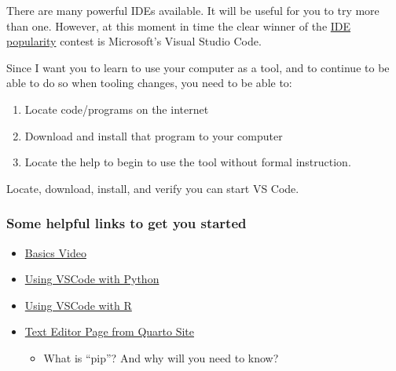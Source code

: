\documentclass[
  letterpaper,
  DIV=11,
  numbers=noendperiod]{scrreprt}
\providecommand{\tightlist}{%
  \setlength{\itemsep}{0pt}\setlength{\parskip}{0pt}}\usepackage{longtable,booktabs,array}
\begin{document}
There are many powerful IDEs available. It will be useful for you to try
more than one. However, at this moment in time the clear winner of the
\href{https://survey.stackoverflow.co/2023/\#most-popular-technologies-new-collab-tools}{IDE
popularity} contest is Microsoft's Visual Studio Code.

Since I want you to learn to use your computer as a tool, and to
continue to be able to do so when tooling changes, you need to be able
to:

\begin{enumerate}
\def\labelenumi{\arabic{enumi}.}
\item
  Locate code/programs on the internet
\item
  Download and install that program to your computer
\item
  Locate the help to begin to use the tool without formal instruction.
\end{enumerate}

\begin{tcolorbox}[enhanced jigsaw, opacityback=0, leftrule=.75mm, colback=white, left=2mm, titlerule=0mm, toprule=.15mm, toptitle=1mm, coltitle=black, title=\textcolor{quarto-callout-tip-color}{\faLightbulb}\hspace{0.5em}{In-class Exercise}, opacitybacktitle=0.6, colbacktitle=quarto-callout-tip-color!10!white, breakable, bottomrule=.15mm, bottomtitle=1mm, colframe=quarto-callout-tip-color-frame, arc=.35mm, rightrule=.15mm]

Locate, download, install, and verify you can start VS Code.

\end{tcolorbox}

\subsubsection{Some helpful links to get you
started}\label{some-helpful-links-to-get-you-started}

\begin{itemize}
\tightlist
\item
  \href{https://code.visualstudio.com/docs/introvideos/basics}{Basics
  Video}
\item
  \href{https://code.visualstudio.com/docs/languages/python}{Using
  VSCode with Python}
\item
  \href{https://code.visualstudio.com/docs/languages/r}{Using VSCode
  with R}
\item
  \href{https://quarto.org/docs/tools/text-editors.html}{Text Editor
  Page from Quarto Site}

  \begin{itemize}
  \tightlist
  \item
    What is ``pip''? And why will you need to know?
  \end{itemize}
\end{itemize}
\end{document}
